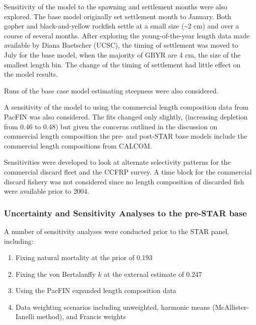 \documentclass[12pt,]{article}
\begin{document}
Sensitivity of the model to the spawning and settlement months were also
explored. The base model originally set settlement month to January.
Both gopher and black-and-yellow rockfish settle at a small size
(\textasciitilde{}2 cm) and over a course of several months. After
exploring the young-of-the-year length data made available by Diana
Baetscher (UCSC), the timing of settlement was moved to July for the
base model, when the majority of GBYR are 4 cm, the size of the smallest
length bin. The change of the timing of settlement had little effect on
the model results.

Runs of the base case model estimating steepness were also considered.

A sensitivity of the model to using the commercial length composition
data from PacFIN was also considered. The fits changed only slightly,
(increasing depletion from 0.46 to 0.48) but given the concerns outlined
in the discussion on commercial length composition the pre- and
post-STAR base models include the commercial length compositions from
CALCOM.

Sensitivities were developed to look at alternate selectivity patterns
for the commercial discard fleet and the CCFRP survey. A time block for
the commercial discard fishery was not considered since no length
composition of discarded fish were available prior to 2004.

\subsubsection{Uncertainty and Sensitivity Analyses to the pre-STAR
base}\label{uncertainty-and-sensitivity-analyses-to-the-pre-star-base}

A number of sensitivity analyses were conducted prior to the STAR panel,
including:

\begin{enumerate}

  \item Fixing natural mortality at the prior of 0.193
  
  \item Fixing the von Bertalanffy $k$ at the external estimate of 0.247
  
  \item Using the PacFIN expanded length composition data
  
  \item Data weighting scenarios including unweighted, harmonic means (McAllister-Ianelli method), and Francis weights

\end{enumerate}
\end{document}
